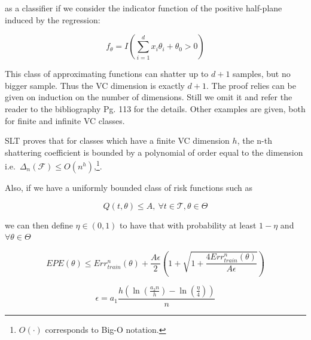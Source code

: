 as a classifier if we consider the indicator function of the positive half-plane induced by the regression:

\begin{equation}
f_{\theta} = I(\sum_{i=1}^d x_i \theta_i + \theta_0 > 0)
\end{equation}

This class of approximating functions can shatter up to $d+1$ samples, but no bigger sample.
Thus the VC dimension is exactly $d+1$.
The proof relies can be given on induction on the number of dimensions.
Still we omit it and refer the reader to the bibliography \citep{cherkassky-learning2007} Pg.
113 for the details.
Other examples are given, both for finite and infinite VC classes.


SLT proves that for classes which have a finite VC dimension $h$, the n-th shattering coefficient is bounded by a polynomial of order equal to the dimension
i.e.\ $\Delta_n(\mathcal {F}) \leq O(n^{h})$,\footnote{$O(\cdot)$ corresponds to Big-O notation.}.


Also, if we have a uniformly bounded class of risk functions such as

\begin{equation}
Q(t,\theta) \leq A,  \ \forall t \in \mathcal {T}, \theta \in \Theta
\end{equation}

we can then define $\eta \in (0,1)$ to have that with probability at least $1 - \eta$ and $\forall \theta \in \Theta$

\begin{equation}
EPE(\theta) \leq Err^n_{train}(\theta) + \frac{A \epsilon}{2} \left(1 + \sqrt{1 + \frac{4 Err^n_{train}(\theta) }{A \epsilon}} \right)
\end{equation}\label{eq:vapnik-classificationBound}



\begin{equation}
\epsilon = a_1 \frac{h \left( \ln(\frac{a_2 n}{h} ) - \ln(\frac{\eta}{4} ) \right)}{n}
\end{equation}\label{eq:vapnik-epsilonBound}

